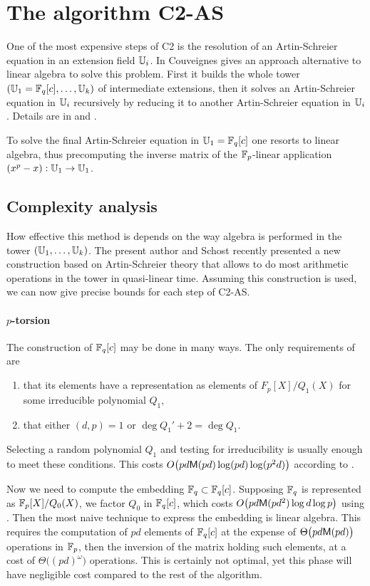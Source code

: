 \section{The algorithm C2-AS}
\label{sec:C2-AS}

One of the most expensive steps of C2 is the resolution of an
Artin-Schreier equation in an extension field $\mathbb{U}_i$. In \cite{Cou00}
Couveignes gives an approach alternative to linear algebra to solve
this problem. First it builds the whole tower $(\mathbb{U}_1=\mathbb{F}_q[c], \ldots,
\mathbb{U}_k)$ of intermediate extensions, then it solves an Artin-Schreier
equation in $\mathbb{U}_i$ recursively by reducing it to another
Artin-Schreier equation in $\mathbb{U}_i$. Details are in \cite{Cou00} and
\cite{DFS09}.

To solve the final Artin-Schreier equation in $\mathbb{U}_1=\mathbb{F}_q[c]$ one
resorts to linear algebra, thus precomputing the inverse matrix of the
$\mathbb{F}_p$-linear application $(x^p-x):\mathbb{U}_1\rightarrow\mathbb{U}_1$.


\subsection{Complexity analysis}
\label{sec:C2-AS:complexity}
How effective this method is depends on the way algebra is performed
in the tower $(\mathbb{U}_1,\ldots,\mathbb{U}_k)$. The present author and Schost
\cite{DFS09} recently presented a new construction based on
Artin-Schreier theory that allows to do most arithmetic operations in
the tower in quasi-linear time. Assuming this construction is used, we
can now give precise bounds for each step of C2-AS.

\paragraph{$p$-torsion}
The construction of $\mathbb{F}_q[c]$ may be done in many ways. The only
requirements of \cite{DFS09} are
\begin{enumerate}
\item that its elements have a representation as elements of
  $F_p[X]/Q_1(X)$ for some irreducible polynomial $Q_1$,
\item that either $(d,p)=1$ or $\deg Q_1' + 2 = \deg Q_1$.
\end{enumerate}
Selecting a random polynomial $Q_1$ and testing for irreducibility is
usually enough to meet these conditions. This costs
$O\bigl(pd\mathrm{\sf M}(pd)\log (pd)\log(p^2d)\bigr)$ according to
\cite[Th. 14.42]{vzGG}.

Now we need to compute the embedding $\mathbb{F}_q\subset\mathbb{F}_q[c]$. Supposing
$\mathbb{F}_q$ is represented as $\mathbb{F}_p[X]/Q_0(X)$, we factor $Q_0$ in
$\mathbb{F}_q[c]$, which costs $O\bigl(pd\mathrm{\sf M}(pd^2)\log d\log p\bigr)$ using
\cite[Coro. 14.16]{vzGG}. Then the most naive technique to express the
embedding is linear algebra. This requires the computation of $pd$
elements of $\mathbb{F}_q[c]$ at the expense of $\Theta\bigl(pd\mathrm{\sf M}(pd)\bigr)$
operations in $\mathbb{F}_p$, then the inversion of the matrix holding such
elements, at a cost of $\Theta\bigl((pd)^\omega\bigr)$ operations. This is
certainly not optimal, yet this phase will have negligible cost
compared to the rest of the algorithm.

